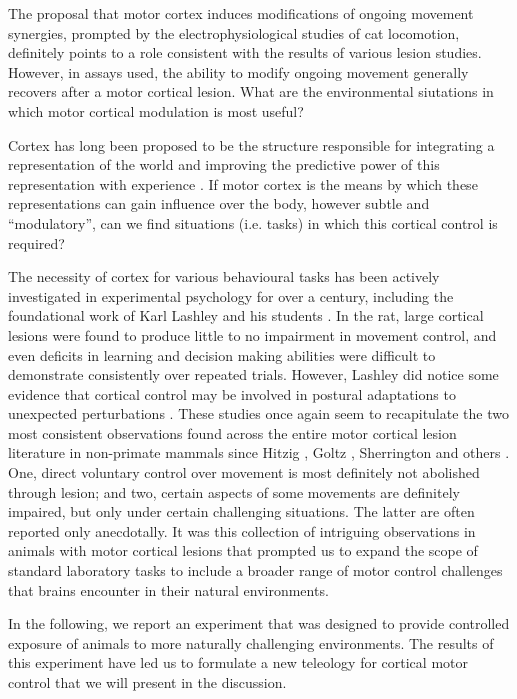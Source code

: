 The proposal that motor cortex induces modifications of ongoing movement synergies, prompted by the electrophysiological studies of cat locomotion, definitely points to a role consistent with the results of various lesion studies. However, in assays used, the ability to modify ongoing movement generally recovers after a motor cortical lesion. What are the environmental siutations in which motor cortical modulation is most useful?

Cortex has long been proposed to be the structure responsible for integrating a representation of the world and improving the predictive power of this representation with experience \cite{Barlow1985,Doya1999}. If motor cortex is the means by which these representations can gain influence over the body, however subtle and ``modulatory'', can we find situations (i.e. tasks) in which this cortical control is required?

The necessity of cortex for various behavioural tasks has been actively investigated in experimental psychology for over a century, including the foundational work of Karl Lashley and his students \cite{Lashley1921a,Lashley1950a}. In the rat, large cortical lesions were found to produce little to no impairment in movement control, and even deficits in learning and decision making abilities were difficult to demonstrate consistently over repeated trials. However, Lashley did notice some evidence that cortical control may be involved in postural adaptations to unexpected perturbations \cite{Lashley1921a}. These studies once again seem to recapitulate the two most consistent observations found across the entire motor cortical lesion literature in non-primate mammals since Hitzig \cite{Fritsch1870}, Goltz \cite{Goltz1888}, Sherrington \cite{Sherrington1885} and others \cite{Oakley1979,Terry1989}. One, direct voluntary control over movement is most definitely not abolished through lesion; and two, certain aspects of some movements are definitely impaired, but only under certain challenging situations. The latter are often reported only anecdotally. It was this collection of intriguing observations in animals with motor cortical lesions that prompted us to expand the scope of standard laboratory tasks to include a broader range of motor control challenges that brains encounter in their natural environments.

In the following, we report an experiment that was designed to provide controlled exposure of animals to more naturally challenging environments. The results of this experiment have led us to formulate a new teleology for cortical motor control that we will present in the discussion.



